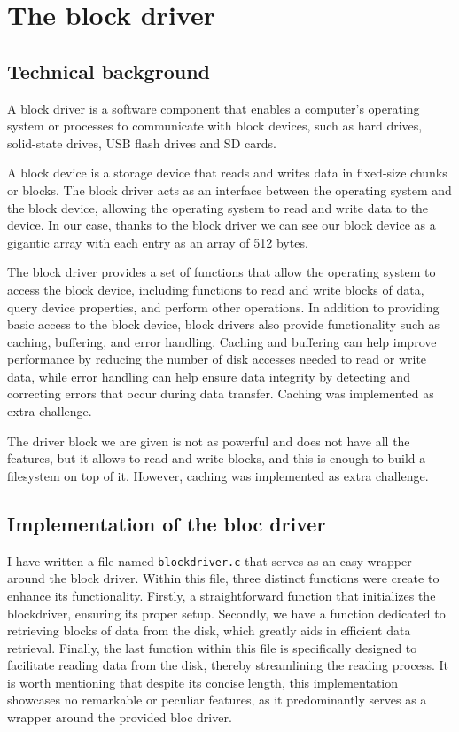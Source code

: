 \section{The block driver}

\subsection{Technical background}

A block driver is a software component that enables a computer's operating system or processes to communicate with block devices, such as hard drives, solid-state drives, USB flash drives and SD cards.

A block device is a storage device that reads and writes data in fixed-size chunks or blocks. The block driver acts as an interface between the operating system and the block device, allowing the operating system to read and write data to the device. In our case, thanks to the block driver we can see our block device as a gigantic array with each entry as an array of 512 bytes.

The block driver provides a set of functions that allow the operating system to access the block device, including functions to read and write blocks of data, query device properties, and perform other operations. In addition to providing basic access to the block device, block drivers also provide functionality such as caching, buffering, and error handling. Caching and buffering can help improve performance by reducing the number of disk accesses needed to read or write data, while error handling can help ensure data integrity by detecting and correcting errors that occur during data transfer. Caching was implemented as extra challenge.

The driver block we are given is not as powerful and does not have all the features, but it allows to read and write blocks, and this is enough to build a filesystem on top of it. However, caching was implemented as extra challenge.

\subsection{Implementation of the bloc driver}

I have written a file named \texttt{blockdriver.c} that serves as an easy wrapper around the block driver. Within this file, three distinct functions were create to enhance its functionality. Firstly,  a straightforward function that initializes the blockdriver, ensuring its proper setup. Secondly, we have a function dedicated to retrieving blocks of data from the disk, which greatly aids in efficient data retrieval. Finally, the last function within this file is specifically designed to facilitate reading data from the disk, thereby streamlining the reading process. It is worth mentioning that despite its concise length, this implementation showcases no remarkable or peculiar features, as it predominantly serves as a wrapper around the provided bloc driver.

